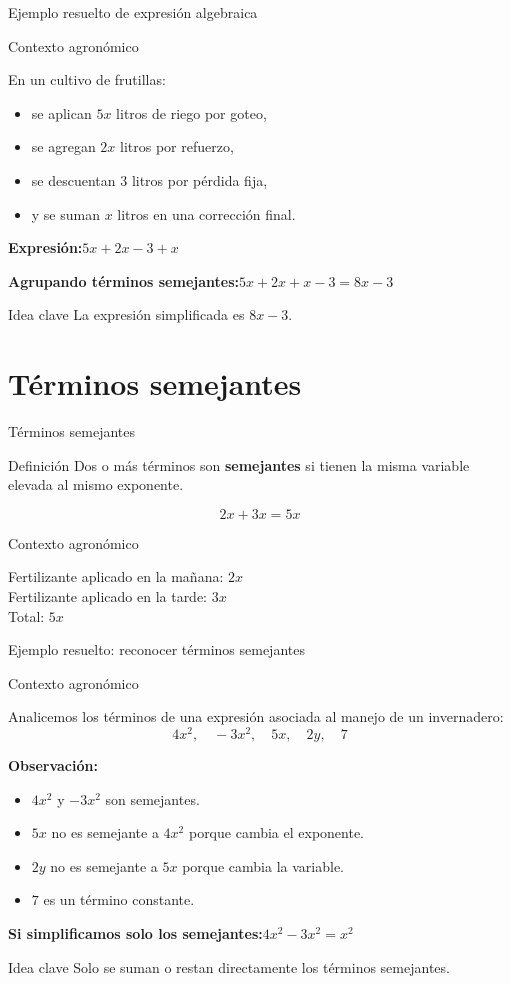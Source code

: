 \documentclass[aspectratio=169,12pt]{beamer}
\newcommand{\IdeaClave}[1]{
	\begin{alertblock}{Idea clave}
		#1
	\end{alertblock}
}
\newcommand{\Agronomia}[1]{
	\begin{exampleblock}{Contexto agronómico}
		#1
	\end{exampleblock}
}
\begin{document}
	\begin{frame}{Ejemplo resuelto de expresión algebraica}
		\Agronomia{
			En un cultivo de frutillas:
			\begin{itemize}
				\item se aplican \(5x\) litros de riego por goteo,
				\pause
				\item se agregan \(2x\) litros por refuerzo,
				\pause
				\item se descuentan \(3\) litros por pérdida fija,
				\pause
				\item y se suman \(x\) litros en una corrección final.
			\end{itemize}
		}
		
		\pause
		\textbf{Expresión:}\quad $5x+2x-3+x$
		
		\pause
		\textbf{Agrupando términos semejantes:}\quad $5x+2x+x-3=8x-3$
		
		\pause
		\IdeaClave{La expresión simplificada es \(8x-3\).}
	\end{frame}
	
	\section{Términos semejantes}
	\begin{frame}{Términos semejantes}
		\begin{block}{Definición}
			Dos o más términos son \textbf{semejantes} si tienen la misma variable elevada al mismo exponente.
		\end{block}
		
		\pause
		\[
		2x+3x=5x
		\]
		
		\pause
		\Agronomia{
			Fertilizante aplicado en la mañana: \(2x\) \\
			Fertilizante aplicado en la tarde: \(3x\) \\
			Total: \(5x\)
		}
	\end{frame}
	
	\begin{frame}{Ejemplo resuelto: reconocer términos semejantes}
		\Agronomia{
			Analicemos los términos de una expresión asociada al manejo de un invernadero:
			\[
			4x^2,\quad -3x^2,\quad 5x,\quad 2y,\quad 7
			\]
		}
		
		\pause
		\textbf{Observación:}
		\begin{itemize}
			\item \(4x^2\) y \(-3x^2\) son semejantes.
			\pause
			\item \(5x\) no es semejante a \(4x^2\) porque cambia el exponente.
			\pause
			\item \(2y\) no es semejante a \(5x\) porque cambia la variable.
			\pause
			\item \(7\) es un término constante.
		\end{itemize}
		
		\pause
		\textbf{Si simplificamos solo los semejantes:}\quad $4x^2-3x^2=x^2$
		
		\pause
		\IdeaClave{Solo se suman o restan directamente los términos semejantes.}
	\end{frame}
	
\end{document}
